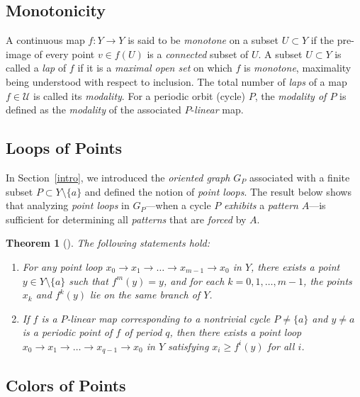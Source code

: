\documentclass[12pt,reqno]{amsart}
\newtheorem{theorem}{Theorem}[section]
\theoremstyle{definition}
\theoremstyle{remark}
\theoremstyle{assumption}
\numberwithin{equation}{section}
\begin{document}
		
	
	\subsection{Monotonicity}\label{monotonicity}
	
	A continuous map $f:Y \to Y$ is said to be \emph{monotone} on a subset $U \subset Y$ if the pre-image of every point $v \in f(U)$ is a \emph{connected} subset of $U$.  
	A subset $U \subset Y$ is called a \emph{lap} of $f$ if it is a \emph{maximal open set} on which $f$ is \emph{monotone}, maximality being understood with respect to inclusion.  
	The total number of \emph{laps} of a map $f \in \mathcal{U}$ is called its \emph{modality}.  
	For a periodic orbit (cycle) $P$, the \emph{modality of $P$} is defined as the \emph{modality} of the associated $P$-\emph{linear} map.
	
	\subsection{Loops of Points}\label{loops}
	
	In Section~\ref{intro}, we introduced the \emph{oriented graph} $G_P$ associated with a finite subset $P \subset Y \setminus \{a\}$ and defined the notion of \emph{point loops}.  
	The result below shows that analyzing \emph{point loops} in $G_P$—when a cycle $P$ \emph{exhibits} a \emph{pattern} $A$—is sufficient for determining all \emph{patterns} that are \emph{forced} by $A$.
	
	\begin{theorem}[\cite{BMR}]\label{loops:orbits:connection:1}
		The following statements hold:
		\begin{enumerate}
			\item For any point loop $x_0 \to x_1 \to \dots \to x_{m-1} \to x_0$ in $Y$, there exists a point $y \in Y \setminus \{a\}$ such that $f^m(y)=y$, and for each $k=0,1,\dots,m-1$, the points $x_k$ and $f^k(y)$ lie on the same branch of $Y$.
			\item If $f$ is a $P$-linear map corresponding to a nontrivial cycle $P \neq \{a\}$ and $y\neq a$ is a periodic point of $f$ of period $q$, then there exists a point loop  
			$x_0 \to x_1 \to \dots \to x_{q-1} \to x_0$ in $Y$ satisfying $x_i \geqslant f^i(y)$ for all $i$.
		\end{enumerate}
	\end{theorem}
	
	\subsection{Colors of Points}\label{colors}
	
\end{document}
